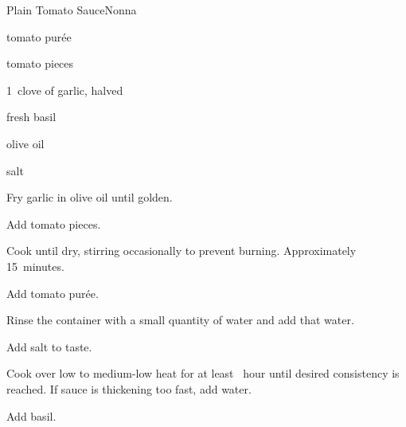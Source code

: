 \begin{recipe}{Plain Tomato Sauce}{Nonna}{}

\begin{ingredients}
\item {} tomato purée
\item \ltr{\half} tomato pieces
\item 1~clove of garlic, halved
\item fresh basil
\item olive oil
\item salt
\end{ingredients}

\begin{directions}
\item Fry garlic in olive oil until golden.
\item Add tomato pieces.
\item Cook until dry, stirring occasionally to prevent burning. Approximately 15~minutes.
\item Add tomato purée.
\item Rinse the container with a small quantity of water and add that water.
\item Add salt to taste.
\item Cook over low to medium-low heat for at least \half~hour until desired consistency is reached. If sauce is thickening too fast, add water.
\item Add basil.
\end{directions}

\end{recipe}
